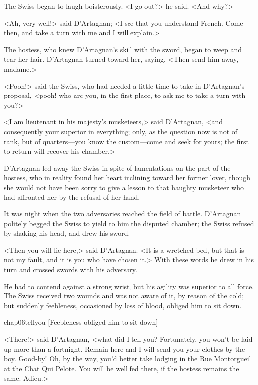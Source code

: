The Swiss began to laugh boisterously. <I go out?> he said. <And why?>

<Ah, very well!> said D'Artagnan; <I see that you understand French. Come then, and take a turn with me and I will explain.>

The hostess, who knew D'Artagnan's skill with the sword, began to weep and tear her hair. D'Artagnan turned toward her, saying, <Then send him away, madame.>

<Pooh!> said the Swiss, who had needed a little time to take in D'Artagnan's proposal, <pooh! who are you, in the first place, to ask me to take a turn with you?>

<I am lieutenant in his majesty's musketeers,> said D'Artagnan, <and consequently your superior in everything; only, as the question now is not of rank, but of quarters—you know the custom—come and seek for yours; the first to return will recover his chamber.>

D'Artagnan led away the Swiss in spite of lamentations on the part of the hostess, who in reality found her heart inclining toward her former lover, though she would not have been sorry to give a lesson to that haughty musketeer who had affronted her by the refusal of her hand.

It was night when the two adversaries reached the field of battle. D'Artagnan politely begged the Swiss to yield to him the disputed chamber; the Swiss refused by shaking his head, and drew his sword.

<Then you will lie here,> said D'Artagnan. <It is a wretched bed, but that is not my fault, and it is you who have chosen it.> With these words he drew in his turn and crossed swords with his adversary.

He had to contend against a strong wrist, but his agility was superior to all force. The Swiss received two wounds and was not aware of it, by reason of the cold; but suddenly feebleness, occasioned by loss of blood, obliged him to sit down.

\begin{bwbigpic}
	[\basicscale] 
	{chap06tellyou}
	[Feebleness obliged him to sit down]
\end{bwbigpic}

<There!> said D'Artagnan, <what did I tell you? Fortunately, you won't be laid up more than a fortnight. Remain here and I will send you your clothes by the boy. Good-by! Oh, by the way, you'd better take lodging in the Rue Montorgueil at the Chat Qui Pelote. You will be well fed there, if the hostess remains the same. Adieu.>

